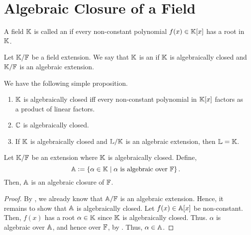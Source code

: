 \section{Algebraic Closure of a Field}

\begin{defn}
    A field $\mathbb{K}$ is called an  if every non-constant polynomial $f(x) \in \mathbb{K}[x]$ has a root in $\mathbb{K}$.
\end{defn}
\begin{defn}
    Let $\mathbb{K}/\mathbb{F}$ be a field extension. We say that $\mathbb{K}$ is an  if $\mathbb{K}$ is algebraically closed and $\mathbb{K}/\mathbb{F}$ is an algebraic extension.
\end{defn}

We have the following simple proposition.

\begin{prop}
    \phantom{hi}
    \begin{enumerate}
        \item $\mathbb{K}$ is algebraically closed iff every non-constant polynomial in $\mathbb{K}[x]$ factors as a product of linear factors. 
        \item $\mathbb{C}$ is algebraically closed.
        \item If $\mathbb{K}$ is algebraically closed and $\mathbb{L}/\mathbb{K}$ is an algebraic extension, then $\mathbb{L} = \mathbb{K}$.
    \end{enumerate}
\end{prop}
\begin{prop} \label{prop:algebraic-closure}
    Let $\mathbb{K}/\mathbb{F}$ be an extension where $\mathbb{K}$ is algebraically closed. Define,
    \[
        \mathbb{A} \vcentcolon= \left\{ \alpha \in \mathbb{K} \mid \alpha \text{ is algebraic over } \mathbb{F} \right\}.
    \]
    Then, $\mathbb{A}$ is an algebraic closure of $\mathbb{F}$.
\end{prop}
\begin{proof}
    By , we already know that $\mathbb{A}/\mathbb{F}$ is an algebraic extension. Hence, it remains to show that $\mathbb{A}$ is algebraically closed. Let $f(x) \in \mathbb{A}[x]$ be non-constant. Then, $f(x)$ has a root $\alpha \in\mathbb{K}$ since $\mathbb{K}$ is algebraically closed. Thus. $\alpha$ is algebraic over $\mathbb{A}$, and hence over $\mathbb{F}$, by . Thus, $\alpha \in \mathbb{A}$.
\end{proof}

